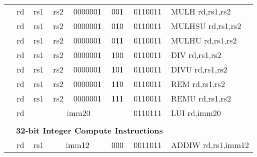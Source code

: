 \begin{table}[p]
\begin{small}
\begin{center}
\begin{tabular}{rccccccccccl}
&
\multicolumn{1}{|c|}{rd} &
\multicolumn{1}{c|}{rs1} &
\multicolumn{1}{c|}{rs2} &
\multicolumn{4}{c|}{0000001} &
\multicolumn{2}{c|}{001} &
\multicolumn{1}{c|}{0110011} & MULH rd,rs1,rs2 \\
\cline{2-11}
  

&
\multicolumn{1}{|c|}{rd} &
\multicolumn{1}{c|}{rs1} &
\multicolumn{1}{c|}{rs2} &
\multicolumn{4}{c|}{0000001} &
\multicolumn{2}{c|}{010} &
\multicolumn{1}{c|}{0110011} & MULHSU rd,rs1,rs2 \\
\cline{2-11}
  

&
\multicolumn{1}{|c|}{rd} &
\multicolumn{1}{c|}{rs1} &
\multicolumn{1}{c|}{rs2} &
\multicolumn{4}{c|}{0000001} &
\multicolumn{2}{c|}{011} &
\multicolumn{1}{c|}{0110011} & MULHU rd,rs1,rs2 \\
\cline{2-11}
  

&
\multicolumn{1}{|c|}{rd} &
\multicolumn{1}{c|}{rs1} &
\multicolumn{1}{c|}{rs2} &
\multicolumn{4}{c|}{0000001} &
\multicolumn{2}{c|}{100} &
\multicolumn{1}{c|}{0110011} & DIV rd,rs1,rs2 \\
\cline{2-11}
  

&
\multicolumn{1}{|c|}{rd} &
\multicolumn{1}{c|}{rs1} &
\multicolumn{1}{c|}{rs2} &
\multicolumn{4}{c|}{0000001} &
\multicolumn{2}{c|}{101} &
\multicolumn{1}{c|}{0110011} & DIVU rd,rs1,rs2 \\
\cline{2-11}
  

&
\multicolumn{1}{|c|}{rd} &
\multicolumn{1}{c|}{rs1} &
\multicolumn{1}{c|}{rs2} &
\multicolumn{4}{c|}{0000001} &
\multicolumn{2}{c|}{110} &
\multicolumn{1}{c|}{0110011} & REM rd,rs1,rs2 \\
\cline{2-11}
  

&
\multicolumn{1}{|c|}{rd} &
\multicolumn{1}{c|}{rs1} &
\multicolumn{1}{c|}{rs2} &
\multicolumn{4}{c|}{0000001} &
\multicolumn{2}{c|}{111} &
\multicolumn{1}{c|}{0110011} & REMU rd,rs1,rs2 \\
\cline{2-11}
  

&
\multicolumn{1}{|c|}{rd} &
\multicolumn{8}{c|}{imm20} &
\multicolumn{1}{c|}{0110111} & LUI rd,imm20 \\
\cline{2-11}
  

&
\multicolumn{10}{c}{} & \\
&
\multicolumn{10}{c}{\bf 32-bit Integer Compute Instructions} & \\
\cline{2-11}
  

&
\multicolumn{1}{|c|}{rd} &
\multicolumn{1}{c|}{rs1} &
\multicolumn{5}{c|}{imm12} &
\multicolumn{2}{c|}{000} &
\multicolumn{1}{c|}{0011011} & ADDIW rd,rs1,imm12 \\
\cline{2-11}
  


\end{tabular}
\end{center}
\end{small}
\end{table}
